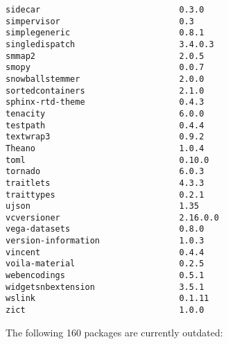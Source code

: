 \begin{verbatim}
sidecar                            0.3.0
simpervisor                        0.3
simplegeneric                      0.8.1
singledispatch                     3.4.0.3
smmap2                             2.0.5
smopy                              0.0.7
snowballstemmer                    2.0.0
sortedcontainers                   2.1.0
sphinx-rtd-theme                   0.4.3
tenacity                           6.0.0
testpath                           0.4.4
textwrap3                          0.9.2
Theano                             1.0.4
toml                               0.10.0
tornado                            6.0.3
traitlets                          4.3.3
traittypes                         0.2.1
ujson                              1.35
vcversioner                        2.16.0.0
vega-datasets                      0.8.0
version-information                1.0.3
vincent                            0.4.4
voila-material                     0.2.5
webencodings                       0.5.1
widgetsnbextension                 3.5.1
wslink                             0.1.11
zict                               1.0.0
\end{verbatim}
%
The following 160 packages are currently outdated:
%
